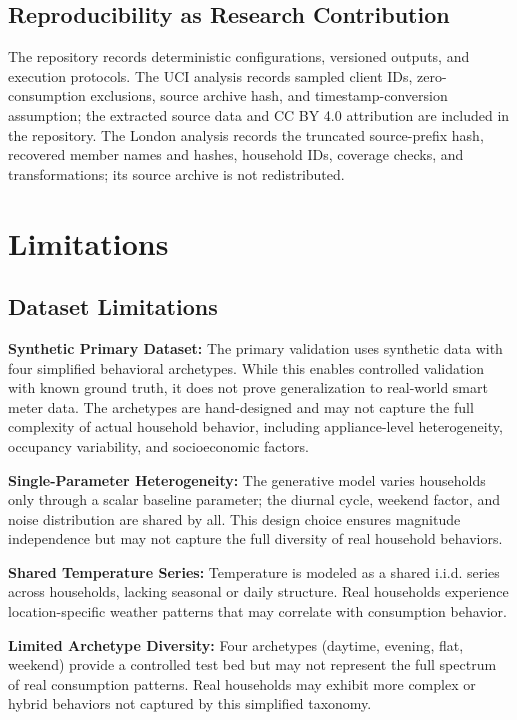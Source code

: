 \documentclass[11pt,a4paper]{article}
\begin{document}
\subsection{Reproducibility as Research Contribution}

The repository records deterministic configurations, versioned outputs, and execution protocols. The UCI analysis records sampled client IDs, zero-consumption exclusions, source archive hash, and timestamp-conversion assumption; the extracted source data and CC BY 4.0 attribution are included in the repository. The London analysis records the truncated source-prefix hash, recovered member names and hashes, household IDs, coverage checks, and transformations; its source archive is not redistributed.

\section{Limitations}
\label{sec:limitations}

\subsection{Dataset Limitations}

\textbf{Synthetic Primary Dataset:} The primary validation uses synthetic data with four simplified behavioral archetypes. While this enables controlled validation with known ground truth, it does not prove generalization to real-world smart meter data. The archetypes are hand-designed and may not capture the full complexity of actual household behavior, including appliance-level heterogeneity, occupancy variability, and socioeconomic factors.

\textbf{Single-Parameter Heterogeneity:} The generative model varies households only through a scalar baseline parameter; the diurnal cycle, weekend factor, and noise distribution are shared by all. This design choice ensures magnitude independence but may not capture the full diversity of real household behaviors.

\textbf{Shared Temperature Series:} Temperature is modeled as a shared i.i.d. series across households, lacking seasonal or daily structure. Real households experience location-specific weather patterns that may correlate with consumption behavior.

\textbf{Limited Archetype Diversity:} Four archetypes (daytime, evening, flat, weekend) provide a controlled test bed but may not represent the full spectrum of real consumption patterns. Real households may exhibit more complex or hybrid behaviors not captured by this simplified taxonomy.
\end{document}

